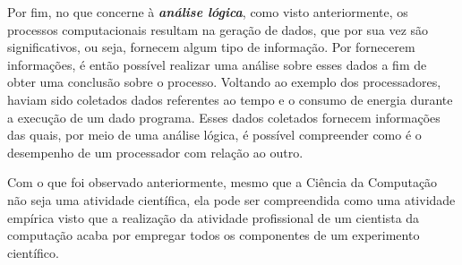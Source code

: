 Por fim, no que concerne à \textbf{\textit{análise lógica}}, como visto anteriormente, os processos computacionais resultam na geração de dados, que por sua vez são significativos, ou seja, fornecem algum tipo de informação. Por fornecerem informações, é então possível realizar uma análise sobre esses dados a fim de obter uma conclusão sobre o processo. Voltando ao exemplo dos processadores, haviam sido coletados dados referentes ao tempo e o consumo de energia durante a execução de um dado programa. Esses dados coletados fornecem informações das quais, por meio de uma análise lógica, é possível compreender como é o desempenho de um processador com relação ao outro. 

Com o que foi observado anteriormente, mesmo que a Ciência da Computação não seja uma atividade científica, ela pode ser compreendida como uma atividade empírica visto que a realização da atividade profissional de um cientista da computação acaba por empregar todos os componentes de um experimento científico.